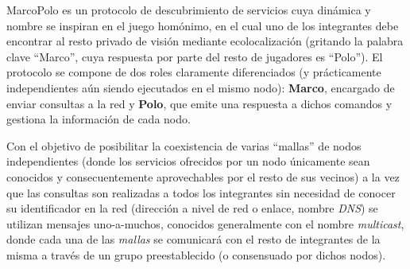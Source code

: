 MarcoPolo es un protocolo de descubrimiento de servicios cuya dinámica y nombre se inspiran en el juego homónimo\citationneeded, en el cual uno de los integrantes debe encontrar al resto privado de visión mediante ecolocalización (gritando la palabra clave ``Marco'', cuya respuesta por parte del resto de jugadores es ``Polo''). El protocolo se compone de dos roles claramente diferenciados (y prácticamente independientes aún siendo ejecutados en el mismo nodo): \textbf{Marco}, encargado de enviar consultas a la red y \textbf{Polo}, que emite una respuesta a dichos comandos y gestiona la información de cada nodo.\citationneeded %

Con el objetivo de posibilitar la coexistencia de varias ``mallas'' de nodos independientes (donde los servicios ofrecidos por un nodo únicamente sean conocidos y consecuentemente aprovechables por el resto de sus vecinos) a la vez que las consultas son realizadas a todos los integrantes sin necesidad de conocer su identificador en la red (dirección a nivel de red o enlace, nombre \textit{DNS}) se utilizan mensajes uno-a-muchos, conocidos generalmente con el nombre \textit{multicast}, donde cada una de las \textit{mallas} se comunicará con el resto de integrantes de la misma a través de un grupo preestablecido (o consensuado por dichos nodos).

